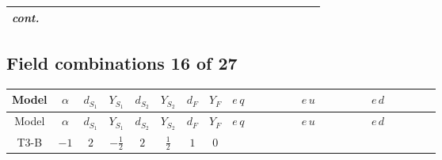 \documentclass[8pt]{article}
\begin{document}
\begin{landscape}
\begin{longtable}{@{}cccccccc >{\raggedright\arraybackslash}p{0.21\linewidth} >{\raggedright\arraybackslash}p{0.21\linewidth} >{\raggedright\arraybackslash}p{0.21\linewidth}@{}}
\textit{cont.} &  &  &  &  &  &  &  & \scriptsize\adjustbox{max width=\linewidth}{$\begin{gathered} -\frac{\hbar  \overline{y_{1,i_1,r_1}} \overline{L_{a_1,i_3}}\, \gamma ^{\mu _1}\, P_L\, L_{a_1,i_1} \overline{q_{\alpha _1,a_2,i_4}}\, \gamma ^{\mu _1}\, P_L\, q_{\alpha _1,a_2,i_4} y_{1,i_3,r_1} g_2^2}{72 m_1^2} \\ -\frac{\hbar  \overline{y_{1,i_1,r_1}} \overline{L_{a_1,i_3}}\, \gamma ^{\mu _1}\, P_L\, L_{a_1,i_1} \overline{q_{\alpha _1,a_2,i_4}}\, \gamma ^{\mu _1}\, P_L\, q_{\alpha _1,a_2,i_4} g_1^2 y_{1,i_3,r_1}}{216 m_1^2} \\ +\frac{\hbar  \text{Delta}\left(i_1,i_3\right) \overline{L_{a_1,i_3}}\, \gamma ^{\mu _1}\, P_L\, L_{a_1,i_1} \overline{q_{\alpha _1,a_2,i_4}}\, \gamma ^{\mu _1}\, P_L\, q_{\alpha _1,a_2,i_4} g_1^4}{720 m_1^2}\end{gathered}$} &  &  \\
\midrule
\bottomrule
\end{longtable}
\clearpage
\subsection*{Field combinations 16 of 27}
\begin{longtable}{@{}cccccccc >{\raggedright\arraybackslash}p{0.21\linewidth} >{\raggedright\arraybackslash}p{0.21\linewidth} >{\raggedright\arraybackslash}p{0.21\linewidth}@{}}
\toprule
Model & $\alpha$ & $d_{S_1}$ & $Y_{S_1}$ & $d_{S_2}$ & $Y_{S_2}$ & $d_F$ & $Y_F$ & $e\,q$ & $e\,u$ & $e\,d$ \\
\midrule
\endfirsthead
\toprule
Model & $\alpha$ & $d_{S_1}$ & $Y_{S_1}$ & $d_{S_2}$ & $Y_{S_2}$ & $d_F$ & $Y_F$ & $e\,q$ & $e\,u$ & $e\,d$ \\
\midrule
\endhead
T3-B & $-1$ & $2$ & $-\frac{1}{2}$ & $2$ & $\frac{1}{2}$ & $1$ & $0$ & \scriptsize\adjustbox{max width=\linewidth}{$\begin{gathered} +\frac{\hbar  \overline{e_{i_3}}\, \gamma ^{\mu _1}\, P_R\, e_{i_3} \overline{q_{\alpha _1,a_1,i_4}}\, \gamma ^{\mu _1}\, P_L\, q_{\alpha _1,a_1,i_4} g_1^4}{360 m_1^2}\end{gathered}$} & \scriptsize\adjustbox{max width=\linewidth}{$\begin{gathered} +\frac{\hbar  \overline{e_{i_3}}\, \gamma ^{\mu _1}\, P_R\, e_{i_3} \overline{u_{\alpha _1,i_4}}\, \gamma ^{\mu _1}\, P_R\, u_{\alpha _1,i_4} g_1^4}{90 m_1^2}\end{gathered}$} & \scriptsize\adjustbox{max width=\linewidth}{$\begin{gathered} -\frac{\hbar  \overline{d_{\alpha _1,i_3}}\, \gamma ^{\mu _1}\, P_R\, d_{\alpha _1,i_3} \overline{e_{i_4}}\, \gamma ^{\mu _1}\, P_R\, e_{i_4} g_1^4}{180 m_1^2}\end{gathered}$} \\
\midrule
\bottomrule
\end{longtable}
\clearpage

\end{landscape}
\end{document}
